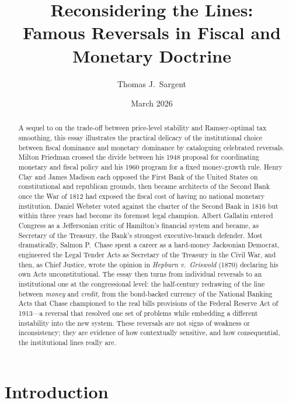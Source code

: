 \documentclass[12pt]{article}
\title{Reconsidering the Lines:\\
\large Famous Reversals in Fiscal and Monetary Doctrine}
\author{Thomas J.~Sargent}
\date{March 2026}
\begin{document}
\maketitle

\begin{abstract}
A sequel to \citet{Sargent2011} on the trade-off between price-level
stability and Ramsey-optimal tax smoothing, this essay illustrates the
practical delicacy of the institutional choice between fiscal dominance
and monetary dominance by cataloguing celebrated reversals.  Milton
Friedman crossed the divide between his 1948 proposal for coordinating
monetary and fiscal policy and his 1960 program for a fixed money-growth
rule.  Henry Clay and James Madison each opposed the First Bank of the
United States on constitutional and republican grounds, then became
architects of the Second Bank once the War of 1812 had exposed the
fiscal cost of having no national monetary institution.
Daniel Webster voted against the charter of the Second Bank in 1816 but
within three years had become its foremost legal champion.  Albert
Gallatin entered Congress as a Jeffersonian critic of Hamilton's financial
system and became, as Secretary of the Treasury, the Bank's strongest
executive-branch defender.  Most
dramatically, Salmon P.\ Chase spent a career as a hard-money Jacksonian
Democrat, engineered the Legal Tender Acts as Secretary of the Treasury
in the Civil War, and then, as Chief Justice, wrote the opinion in
\textit{Hepburn v.\ Griswold} (1870) declaring his own Acts
unconstitutional.  The essay then turns from individual reversals to an
institutional one at the congressional level: the half-century redrawing
of the line between \emph{money} and \emph{credit}, from the bond-backed
currency of the National Banking Acts that Chase championed to the real
bills provisions of the Federal Reserve Act of 1913---a reversal that
resolved one set of problems while embedding a different instability into
the new system.  These reversals are not signs of weakness or
inconsistency; they are evidence of how contextually sensitive, and how
consequential, the institutional lines really are.
\end{abstract}

\tableofcontents
\bigskip

\section{Introduction}
\end{document}
